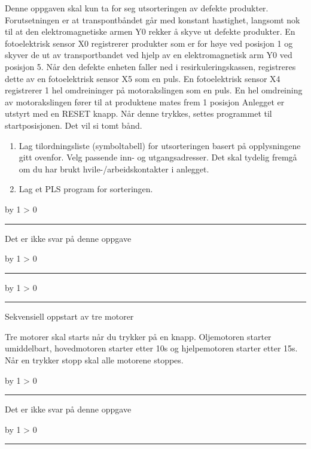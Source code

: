 \documentclass[12pt,a4paper]{article}
\def\oppgave{
            \advance\questnum by 1
            \ifnum \questnum > 0
                 \hrule
                 \vskip 3pt
                 \leftline{Oppgave \the\questnum}
                 \vskip 3pt \fi}
\def\svar{
           \advance\answnum by 1
           \ifnum \answnum > 0
                \hrule
                \vskip 3pt
                \leftline{Svar \the\answnum}
                \vskip 3pt \fi}
\def\notes{
           \advance\explnum by 1
           \ifnum \explnum > 0
                \hrule
                \vskip 3pt
                \leftline{Notes \the\explnum}
                \vskip 3pt \fi}
\begin{document}

Denne oppgaven skal kun ta for seg utsorteringen av defekte produkter.
Forutsetningen er at transpontbåndet går med konstant hastighet, langsomt
nok til at den elektromagnetiske armen Y0 rekker å skyve ut defekte
produkter. En fotoelektrisk sensor X0 registrerer produkter som er
for høye ved posisjon 1 og skyver de ut av transportbandet ved hjelp
av en elektromagnetisk arm Y0 ved posisjon 5. Når den defekte enheten
faller ned i resirkuleringskassen, registreres dette av en fotoelektrisk
sensor X5 som en puls. En fotoelektrisk sensor X4 registrerer 1 hel
omdreininger på motorakslingen som en puls. En hel omdreining av motorakslingen
fører til at produktene mates frem 1 posisjon Anlegget er utstyrt
med en RESET knapp. Når denne trykkes, settes programmet til startposisjonen.
Det vil si tomt bånd. 
\begin{enumerate}
\item Lag tilordningsliste (symboltabell) for utsorteringen basert på opplysningene
gitt ovenfor. Velg passende inn- og utgangsadresser. Det skal tydelig
fremgå om du har brukt hvile-/arbeidskontakter i anlegget.
\item Lag et PLS program for sorteringen. 
\end{enumerate}

\vskip 10pt

\vskip 10pt \filbreak 





\svar{} 
Det er ikke svar på denne oppgave
\vskip 10pt \filbreak 





\notes{} 



\vfil \eject 





\oppgave{} 


Sekvensiell oppstart av tre motorer 

Tre motorer skal starts når du trykker på en knapp. Oljemotoren starter
umiddelbart, hovedmotoren starter etter 10s og hjelpemotoren starter
etter 15s. Når en trykker stopp skal alle motorene stoppes. 

\vskip 10pt
\vskip 10pt \filbreak 





\svar{} 
Det er ikke svar på denne oppgave
\vskip 10pt \filbreak 





\notes{} 



\vfil \eject 
\end{document}
